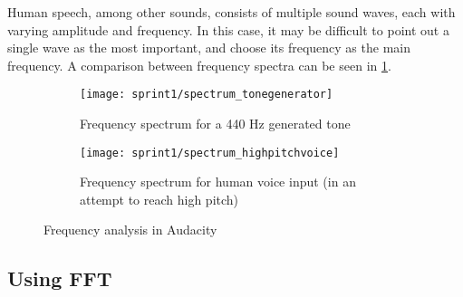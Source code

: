 Human speech, among other sounds, consists of multiple sound waves, each with varying amplitude and frequency.
In this case, it may be difficult to point out a single wave as the most important, and choose its frequency as the main frequency.
A comparison between frequency spectra can be seen in \cref{fig:frequency_spectra}.

\begin{figure}[h]
\centering
\begin{subfigure}[t]{.45\textwidth}
\texttt{[image: sprint1/spectrum\_tonegenerator]}
\caption{Frequency spectrum for a 440 Hz generated tone}
\end{subfigure}
\begin{subfigure}[t]{.45\textwidth}
\texttt{[image: sprint1/spectrum\_highpitchvoice]}
\caption{Frequency spectrum for human voice input (in an attempt to reach high pitch)}
\end{subfigure}
\caption{Frequency analysis in Audacity}
\label{fig:frequency_spectra}
\end{figure}

\subsection{Using FFT}

